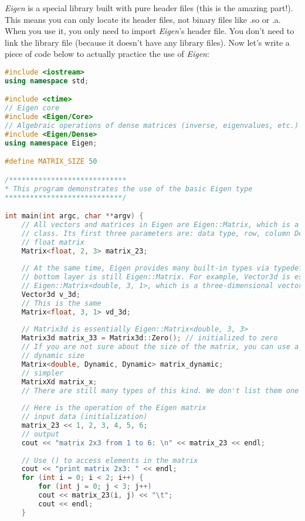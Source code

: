 \textit{Eigen} is a special library built with pure header files (this is the amazing part!). This means you can only locate its header files, not binary files like .so or .a. When you use it, you only need to import \textit{Eigen}'s header file. You don't need to link the library file (because it doesn't have any library files). Now let's write a piece of code below to actually practice the use of \textit{Eigen}:
\begin{lstlisting}[language=c++,caption=slambook2/ch3/useEigen/eigenMatrix.cpp]
#include <iostream>
using namespace std;

#include <ctime>
// Eigen core
#include <Eigen/Core>
// Algebraic operations of dense matrices (inverse, eigenvalues, etc.)
#include <Eigen/Dense>
using namespace Eigen;

#define MATRIX_SIZE 50

/****************************
* This program demonstrates the use of the basic Eigen type
****************************/

int main(int argc, char **argv) {
    // All vectors and matrices in Eigen are Eigen::Matrix, which is a template
    // class. Its first three parameters are: data type, row, column Declare a 2*3
    // float matrix
    Matrix<float, 2, 3> matrix_23;
    
    // At the same time, Eigen provides many built-in types via typedef, but the
    // bottom layer is still Eigen::Matrix. For example, Vector3d is essentially
    // Eigen::Matrix<double, 3, 1>, which is a three-dimensional vector.
    Vector3d v_3d;
    // This is the same
    Matrix<float, 3, 1> vd_3d;
    
    // Matrix3d is essentially Eigen::Matrix<double, 3, 3>
    Matrix3d matrix_33 = Matrix3d::Zero(); // initialized to zero
    // If you are not sure about the size of the matrix, you can use a matrix of
    // dynamic size
    Matrix<double, Dynamic, Dynamic> matrix_dynamic;
    // simpler
    MatrixXd matrix_x;
    // There are still many types of this kind. We don't list them one by one.
    
    // Here is the operation of the Eigen matrix
    // input data (initialization)
    matrix_23 << 1, 2, 3, 4, 5, 6;
    // output
    cout << "matrix 2x3 from 1 to 6: \n" << matrix_23 << endl;
    
    // Use () to access elements in the matrix
    cout << "print matrix 2x3: " << endl;
    for (int i = 0; i < 2; i++) {
        for (int j = 0; j < 3; j++)
        cout << matrix_23(i, j) << "\t";
        cout << endl;
    }
    

\end{lstlisting}

